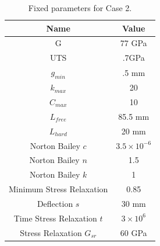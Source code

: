 \documentclass[10pt]{article}
\begin{document}
\vspace{-.4in}
	 \begin{table}[H]
	 \caption{Fixed parameters for Case 2.}
	 \centering 
	 	\begin{tabular}{c  c}
		\hline \hline 
	 	 Name & Value\\
		\hline
	 	 G & 77 GPa \\
		 UTS & .7GPa \\
		 $g_{min}$ & .5 mm\\ 
	 	 $k_{max}$ & 20\\
		 $C_{max}$ & 10\\
		 $L_{free}$ & 85.5 mm\\
		 $L_{hard}$ & 20 mm\\
		 Norton Bailey $c$& $ 3.5 \times 10^{-6}$ \\
		 Norton Bailey $n$ & 1.5\\
		 Norton Bailey $k$ & 1 \\
		 Minimum Stress Relaxation & 0.85\\
		 Deflection $s$ & 30 mm\\
		 Time Stress Relaxation $t$  & $3 \times 10^{6}$\\
		 Stress Relaxation $G_{sr}$ & 60 GPa\\
		\hline \hline
	 \end{tabular}
	 \end{table}
\end{document}
